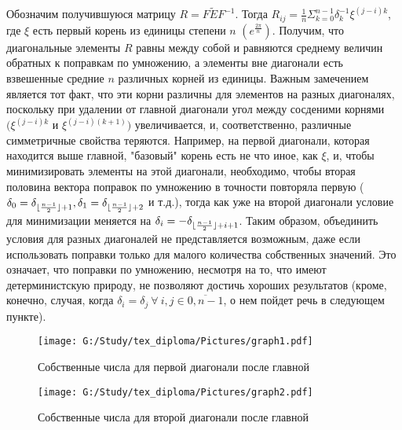 \documentclass[a4paper]{article}
\DeclarePairedDelimiter\floor{\lfloor}{\rfloor}
\theoremstyle{definition}
\begin{document}
    Обозначим получившуюся матрицу $R = F\tilde{E}F^{-1}$. Тогда $R_{ij} = \frac{1}{n}\Sigma_{k=0}^{n-1} \delta_k^{-1} \xi^{(j-i)k}$, где $\xi$ есть первый корень из единицы степени $n$  $(e^{\frac{2\pi}{n}})$. Получим, что диагональные элементы $R$ равны между собой и равняются среднему величин обратных к поправкам по умножению, а элементы вне диагонали есть взвешенные средние $n$ различных корней из единицы. Важным замечением является тот факт, что эти корни различны для элементов на разных диагоналях, поскольку при удалении от главной диагонали угол между сосденими корнями $(\xi^{(j-i)k}$ и $\xi^{(j-i)(k+1)})$ увеличивается, и, соответственно, различные симметричные свойства теряются. Например, на первой диагонали, которая находится выше главной, "базовый" корень есть не что иное, как $\xi$, и, чтобы минимизировать элементы на этой диагонали, необходимо, чтобы вторая половина вектора поправок по умножению в точности повторяла первую ($\delta_0 = \delta_{\floor{\frac{n-1}{2}}+1}, \delta_1 = \delta_{\floor{\frac{n-1}{2}}+2}$ и т.д.), тогда как уже на второй диагонали условие для минимизации меняется на $\delta_i = -\delta_{\floor{\frac{n-1}{2}}+i+1}$. Таким образом, объединить условия для разных диагоналей не представляется возможным, даже если использовать поправки только для малого количества собственных значений. Это означает, что поправки по умножению, несмотря на то, что имеют детерминистскую природу, не позволяют достичь хороших результатов (кроме, конечно, случая, когда $\delta_i = \delta_j~ \forall~ i, j\in \overline{0, n-1}$, о нем пойдет речь в следующем пункте).


\begin{minipage}{70mm}
    \begin{figure}[H]
            \texttt{[image: G:/Study/tex\_diploma/Pictures/graph1.pdf]}
            \label{Graph1}
            \caption[Собственные числа для первой диагонали после главной]{Собственные числа для первой диагонали после главной}
        \end{figure}
\end{minipage}
\hfill
\begin{minipage}{70mm}
  \begin{figure}[H]
            \texttt{[image: G:/Study/tex\_diploma/Pictures/graph2.pdf]}
            \label{Graph2}
            \caption[Собственные числа для второйдиагонали после главной]{Собственные числа для второй диагонали после главной}
        \end{figure}
\end{minipage}
\hfill
\vspace*{2mm}
\end{document}
